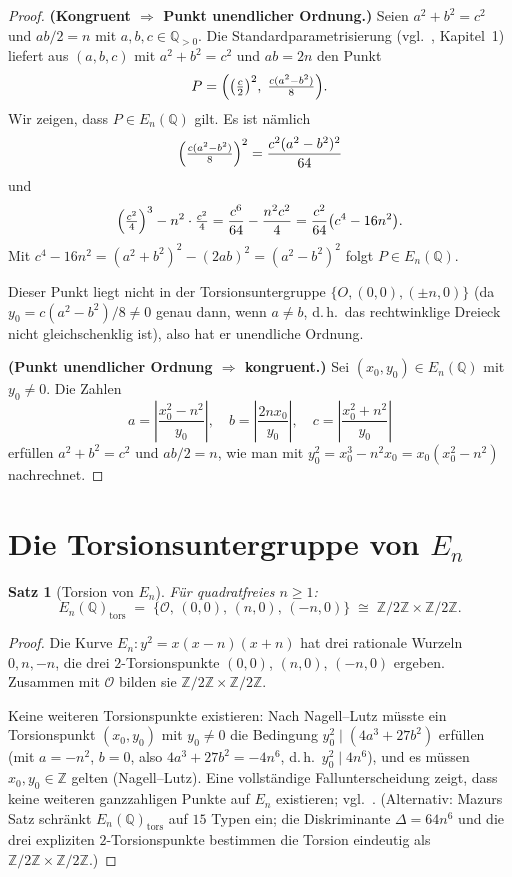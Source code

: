 \documentclass[12pt,a4paper]{amsart}
\newtheorem{theorem}{Satz}[section]
\theoremstyle{definition}
\newcommand{\Z}{\mathbb{Z}}
\newcommand{\Q}{\mathbb{Q}}
\begin{document}
\begin{proof}
\textbf{(Kongruent $\Rightarrow$ Punkt unendlicher Ordnung.)}
Seien $a^2 + b^2 = c^2$ und $ab/2 = n$ mit $a,b,c \in \Q_{>0}$.
Die Standardparametrisierung (vgl.\ \cite{Koblitz1984}, Kapitel~1) liefert
aus $(a,b,c)$ mit $a^2+b^2=c^2$ und $ab=2n$ den Punkt
\[
  P = \Bigl(\bigl(\tfrac{c}{2}\bigr)^2,\; \tfrac{c(a^2-b^2)}{8}\Bigr).
\]
Wir zeigen, dass $P \in E_n(\Q)$ gilt. Es ist nämlich
\[
  \Bigl(\tfrac{c(a^2-b^2)}{8}\Bigr)^2
  = \frac{c^2(a^2-b^2)^2}{64}
\]
und
\[
  \Bigl(\tfrac{c^2}{4}\Bigr)^3 - n^2\cdot\tfrac{c^2}{4}
  = \frac{c^6}{64} - \frac{n^2 c^2}{4}
  = \frac{c^2}{64}\bigl(c^4 - 16n^2\bigr).
\]
Mit $c^4 - 16n^2 = (a^2+b^2)^2 - (2ab)^2 = (a^2-b^2)^2$ folgt
$P \in E_n(\Q)$.

Dieser Punkt liegt nicht in der Torsionsuntergruppe $\{O, (0,0), (\pm n, 0)\}$
(da $y_0 = c(a^2-b^2)/8 \ne 0$ genau dann, wenn $a \ne b$,
d.\,h.\ das rechtwinklige Dreieck nicht gleichschenklig ist), also hat er unendliche Ordnung.

\textbf{(Punkt unendlicher Ordnung $\Rightarrow$ kongruent.)}
Sei $(x_0,y_0) \in E_n(\Q)$ mit $y_0 \ne 0$. Die Zahlen
\[
  a = \left|\frac{x_0^2 - n^2}{y_0}\right|, \quad
  b = \left|\frac{2nx_0}{y_0}\right|, \quad
  c = \left|\frac{x_0^2 + n^2}{y_0}\right|
\]
erf\"ullen $a^2 + b^2 = c^2$ und $ab/2 = n$, wie man mit
$y_0^2 = x_0^3 - n^2 x_0 = x_0(x_0^2-n^2)$ nachrechnet.
\end{proof}

\section{Die Torsionsuntergruppe von \texorpdfstring{$E_n$}{En}}

\begin{theorem}[Torsion von $E_n$]
\label{thm:torsion_En}
F\"ur quadratfreies $n \ge 1$:
\[
  E_n(\Q)_{\mathrm{tors}} \;=\; \{\mathcal{O},\, (0,0),\, (n,0),\, (-n,0)\}
  \;\cong\; \Z/2\Z \times \Z/2\Z.
\]
\end{theorem}

\begin{proof}
Die Kurve $E_n: y^2 = x(x-n)(x+n)$ hat drei rationale Wurzeln $0, n, -n$,
die drei $2$-Torsionspunkte $(0,0)$, $(n,0)$, $(-n,0)$ ergeben.
Zusammen mit $\mathcal{O}$ bilden sie $\Z/2\Z \times \Z/2\Z$.

Keine weiteren Torsionspunkte existieren: Nach Nagell--Lutz m\"usste ein
Torsionspunkt $(x_0, y_0)$ mit $y_0 \ne 0$ die Bedingung $y_0^2 \mid (4a^3 + 27b^2)$
erf\"ullen (mit $a = -n^2$, $b = 0$, also $4a^3 + 27b^2 = -4n^6$, d.\,h.\
$y_0^2 \mid 4n^6$), und es m\"ussen $x_0, y_0 \in \Z$ gelten (Nagell--Lutz).
Eine vollst\"andige Fallunterscheidung zeigt, dass keine weiteren
ganzzahligen Punkte auf $E_n$ existieren; vgl.\ \cite{Silverman1992}.
(Alternativ: Mazurs Satz schr\"ankt $E_n(\Q)_{\mathrm{tors}}$ auf $15$ Typen ein;
die Diskriminante $\Delta = 64n^6$ und die drei expliziten $2$-Torsionspunkte
bestimmen die Torsion eindeutig als $\Z/2\Z \times \Z/2\Z$.)
\end{proof}
\end{document}
